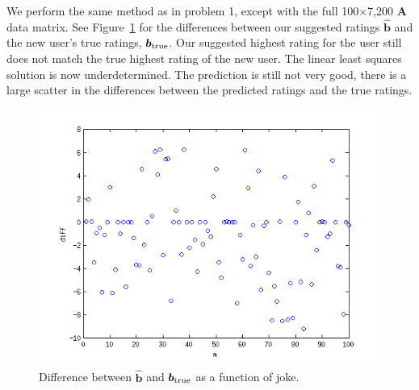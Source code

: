 \documentclass{article}
\begin{document}
\begin{homeworkProblem}
    
    We perform the same method as in problem 1, except with the full
    100$\times$7,200 $\bm{A}$ data matrix. See Figure~\ref{fig:prob2} for the
    differences between our suggested ratings $\bm{\hat{b}}$ and the new user's
    true ratings, $\bm{b}_{\rm true}$. Our suggested highest rating for the
    user still does not match the true highest rating of the new user. The
    linear least squares solution is now underdetermined. The prediction is
    still not very good, there is a large scatter in the differences between
    the predicted ratings and the true ratings.

    \begin{figure}
        
        \includegraphics[width=\linewidth]{prob2_fig.png}

        \caption{\label{fig:prob2} Difference between $\bm{\hat{b}}$ and
        $\bm{b}_{\rm true}$ as a function of joke.}

    \end{figure}

\end{homeworkProblem}
\clearpage
\end{document}
